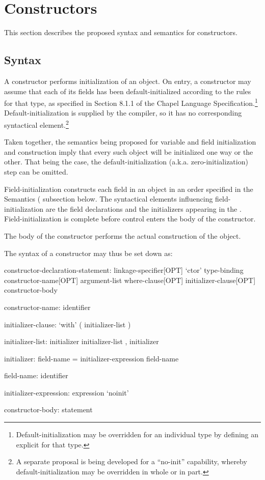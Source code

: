 \section{Constructors}
\label{Constructors}

This section describes the proposed syntax and semantics for constructors.

\subsection{Syntax}
\label{Constructors_Syntax}

A constructor performs initialization of an object.  On entry, a
constructor may assume that each of its fields has been default-initialized according to the
rules for that type, as specified in Section 8.1.1 of the Chapel Language
Specification.\footnote{Default-initialization may be overridden for an individual type by
  defining an explicit  for that type.}
Default-initialization is supplied by the compiler, so it has no corresponding syntactical
element.\footnote{A separate proposal is being developed for a ``no-init'' capability,
  whereby default-initialization may be overridden in whole or in part.}

Taken together, the semantics being proposed for variable and field initialization and
construction imply that every such object will be initialized one way or the
other.  That being the case, the default-initialization
(a.k.a. zero-initialization) step can be omitted.

Field-initialization
constructs each field in an object in an order specified in the Semantics
( subsection below.  The syntactical elements influencing
field-initialization are the field declarations and the initializers appearing in the
.  Field-initialization is complete before control enters the body
of the constructor.

The body of the constructor performs the actual construction of the object.  

The syntax of a constructor may thus be set down as:
\begin{syntax}
constructor-declaration-statement:
  linkage-specifier[OPT] `ctor' type-binding constructor-name[OPT] argument-list 
    where-clause[OPT] initializer-clause[OPT] constructor-body

constructor-name:
  identifier

initializer-clause:
  `with' ( initializer-list )

initializer-list:
  initializer
  initializer-list , initializer

initializer:
  field-name = initializer-expression
  field-name

field-name:
  identifier

initializer-expression:
  expression
  `noinit'

constructor-body:
  statement
\end{syntax}

